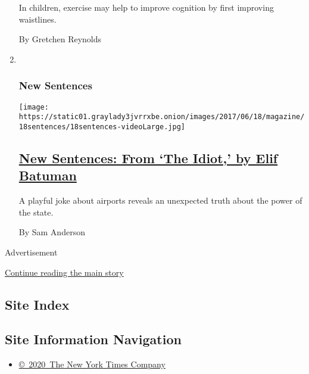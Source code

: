 \begin{enumerate}
  In children, exercise may help to improve cognition by first improving
  waistlines.

  By Gretchen Reynolds
\item ~
  \hypertarget{new-sentences}{%
  \subsubsection{New Sentences}\label{new-sentences}}

  \texttt{[image: https://static01.graylady3jvrrxbe.onion/images/2017/06/18/magazine/18sentences/18sentences-videoLarge.jpg]}

  \hypertarget{new-sentences-from-the-idiot-by-elif-batuman}{%
  \subsection{\texorpdfstring{\href{/2017/06/13/magazine/new-sentences-from-the-idiot-by-elif-batuman.html}{New
  Sentences: From `The Idiot,' by Elif
  Batuman}}{New Sentences: From `The Idiot,' by Elif Batuman}}\label{new-sentences-from-the-idiot-by-elif-batuman}}

  A playful joke about airports reveals an unexpected truth about the
  power of the state.

  By Sam Anderson
\end{enumerate}

Advertisement

\protect\hyperlink{after-mid1}{Continue reading the main story}

\hypertarget{site-index}{%
\subsection{Site Index}\label{site-index}}

\hypertarget{site-information-navigation}{%
\subsection{Site Information
Navigation}\label{site-information-navigation}}

\begin{itemize}
\tightlist
\item
  \href{https://help.nytimes3xbfgragh.onion/hc/en-us/articles/115014792127-Copyright-notice}{©~2020~The
  New York Times Company}
\end{itemize}

